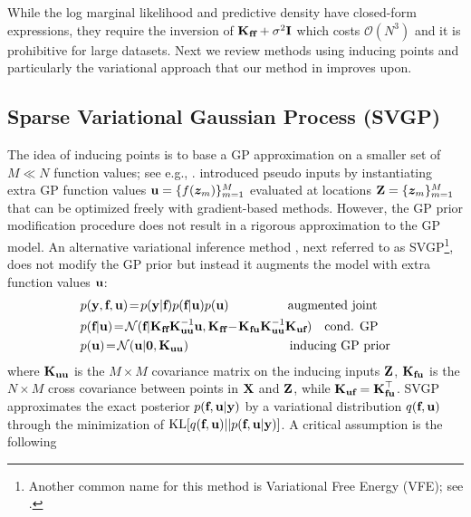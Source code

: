 While the log marginal likelihood and predictive density have closed-form
expressions, they require 
the inversion of $\textbf{K}_{\textbf{f}\textbf{f}} + \sigma^2 \textbf{I}$ which costs $\mathcal{O}(N^3)$ and it is prohibitive for large datasets.  
Next we review methods using inducing 
points and particularly the 
variational approach \cite{titsias2009variational} that our method in  improves upon. 

\subsection{Sparse Variational Gaussian Process (SVGP)} 

The idea of inducing points 
 is to base a GP approximation 
on a smaller set of $M \ll N$  function values; see e.g., \citet{csato-opper-02,seeger-williams-lawrence-03a,Snelson2006,candela-rasmussen-05}. \citet{Snelson2006}
introduced pseudo inputs 
by instantiating extra GP function values $\textbf{u} = \{f(\boldsymbol{z}_m)\}_{m=1}^M$ evaluated at locations $\textbf{Z} = \{\boldsymbol{z}_m\}_{m=1}^M$ 
that can be optimized freely with gradient-based methods. However, 
the GP prior modification procedure 
\cite{candela-rasmussen-05,Snelson2006} 
does not result in a rigorous  approximation to the GP model. An alternative variational inference method  
\cite{titsias2009variational}, next referred to as
SVGP\footnote{Another common name for this method is Variational Free Energy (VFE); see \citet{Buietal2017,baueretal16,LiuetalGPreview20}.}, does not modify the GP prior but instead it augments the model with extra function values $\textbf{u}$: 
\begin{align}
& p(\y, \f, \bu) 
 \! = \! p(\y | \f) 
p(\f | \bu) p(\bu) \ \ \ \ \ \ \ \  \ \ \ \  \ \ \text{augmented joint}
\label{eq:augm-joint}
\\ 
& p(\f | \bu)   
\! = \! \mathcal{N}(\f | \K_{\f \f} \K_{\bu \bu}^{-1} \bu, \K_{\f \f} \! - \! \K_{\f \bu} \K_{\bu \bu}^{-1} \K_{\bu  \f}) \ \ \ \text{cond. GP} 
\label{eq:cond-gp-prior}
\\
& p(\bu) \! = \! \mathcal{N}(\bu | {\bf 0}, \K_{\bu \bu})  \ \ \ \ \ \ \ \ \ \ \ \ \ \ \ \ \ \ \ \ \ \ \ \ \text{inducing GP prior}
\label{eq:ind-gp-prior}
\end{align}
where $\textbf{K}_{\textbf{u} \textbf{u}}$ is the $M \times M$ covariance matrix on the 
inducing inputs $\textbf{Z}$, 
$\textbf{K}_{\textbf{f} \textbf{u}}$ is the $N \times M$ cross covariance between points in $\textbf{X}$ and $\textbf{Z}$, while $\textbf{K}_{\textbf{u} \textbf{f}} = \textbf{K}_{\textbf{f} \textbf{u}}^\top$.  SVGP %
approximates the exact posterior $p(\textbf{f}, \textbf{u}|\textbf{y})$ by a variational 
distribution $q(\textbf{f}, \textbf{u})$ through the minimization of  $\text{KL}[q(\textbf{f}, \textbf{u}) || p(\textbf{f}, \textbf{u}|\textbf{y})]$. A critical assumption is the following 
